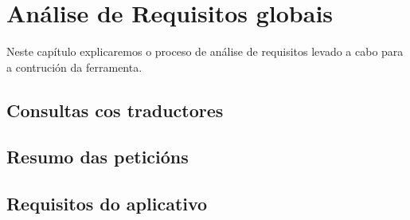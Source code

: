 \chapter[Análise de Requisitos]{Análise de Requisitos globais}

Neste capítulo explicaremos o proceso de análise de requisitos levado a cabo para a contrución da ferramenta.

\section{Consultas cos traductores}

\section{Resumo das peticións}

\section{Requisitos do aplicativo}

%
%